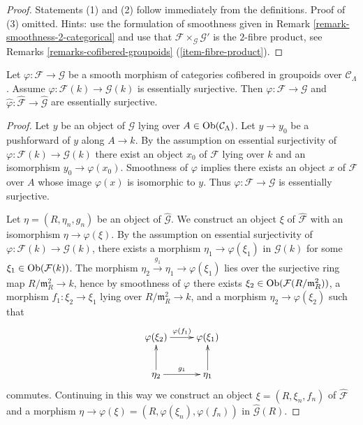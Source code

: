 \begin{proof}
Statements (1) and (2) follow immediately from the definitions.
Proof of (3) omitted. Hints: use the formulation of smoothness given in
Remark \ref{remark-smoothness-2-categorical}
and use that $\mathcal{F} \times_\mathcal{G} \mathcal{G}'$
is the $2$-fibre product, see
Remarks \ref{remarks-cofibered-groupoids} (\ref{item-fibre-product}).
\end{proof}

\begin{lemma}
\label{lemma-smooth-morphism-essentially-surjective}
Let $\varphi : \mathcal{F} \to \mathcal{G}$ be a smooth morphism of
categories cofibered in groupoids over $\mathcal{C}_\Lambda$.  Assume
$\varphi : \mathcal{F}(k) \to \mathcal{G}(k)$ is essentially surjective.
Then $\varphi : \mathcal{F} \to \mathcal{G}$ and
$\widehat{\varphi} : \widehat{\mathcal{F}} \to \widehat{\mathcal{G}}$
are essentially surjective.
\end{lemma}

\begin{proof}
Let $y$ be an object of $\mathcal{G}$ lying over
$A \in \mathop{\mathrm{Ob}}\nolimits(\mathcal{C}_\Lambda)$. Let $y \to y_0$ be a pushforward
of $y$ along $A \to k$. By the assumption on essential surjectivity of
$\varphi : \mathcal{F}(k) \to \mathcal{G}(k)$ there exist an object
$x_0$ of $\mathcal{F}$ lying over $k$ and an isomorphism
$y_0 \to \varphi(x_0)$. Smoothness of $\varphi$ implies there exists
an object $x$ of $\mathcal{F}$ over $A$ whose image $\varphi(x)$
is isomorphic to $y$. Thus $\varphi : \mathcal{F} \to \mathcal{G}$
is essentially surjective.

\medskip\noindent
Let $\eta = (R, \eta_n, g_n)$ be an object of $\widehat{\mathcal{G}}$.  We
construct an object $\xi$ of $\widehat{\mathcal{F}}$ with an isomorphism
$\eta \to \varphi(\xi)$. By the assumption on essential surjectivity of
$\varphi : \mathcal{F}(k) \to \mathcal{G}(k)$, there exists a morphism
$\eta_1 \to \varphi(\xi_1)$ in $\mathcal{G}(k)$ for some
$\xi_1 \in \mathop{\mathrm{Ob}}\nolimits(\mathcal{F}(k))$. The morphism
$\eta_2 \xrightarrow{g_1} \eta_1 \to \varphi(\xi_1)$
lies over the surjective ring map $R/\mathfrak m_R^2 \to k$, hence
by smoothness of $\varphi$ there exists
$\xi_2 \in \mathop{\mathrm{Ob}}\nolimits(\mathcal{F}(R/\mathfrak m_R^2))$, a
morphism $f_1: \xi_2 \to \xi_1$ lying over
$R/\mathfrak m_R^2 \to k$, and a morphism
$\eta_2 \to \varphi(\xi_2)$ such that
$$
\xymatrix{
\varphi(\xi_2)  \ar[r]^{\varphi(f_1)} &  \varphi(\xi_{1})   \\
\eta_2   \ar[u] \ar[r]^{g_1}  & \eta_1  \ar[u] \\
}
$$
commutes. Continuing in this way we construct an object
$\xi = (R, \xi_n, f_n)$ of $\widehat{\mathcal{F}}$ and a morphism
$\eta \to \varphi(\xi) = (R, \varphi(\xi_n), \varphi(f_n))$
in $\widehat{\mathcal{G}}(R)$.
\end{proof}


